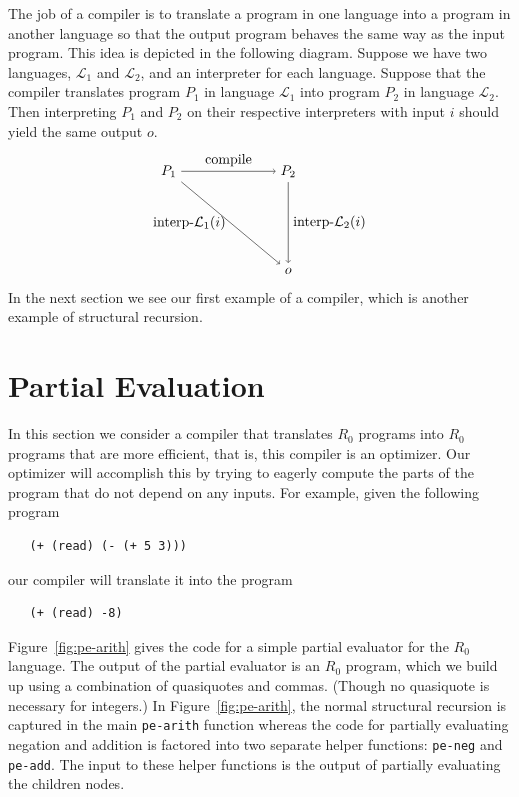 \documentclass[11pt]{book}
\begin{document}
The job of a compiler is to translate a program in one language into a
program in another language so that the output program behaves the
same way as the input program. This idea is depicted in the following
diagram. Suppose we have two languages, $\mathcal{L}_1$ and
$\mathcal{L}_2$, and an interpreter for each language.  Suppose that
the compiler translates program $P_1$ in language $\mathcal{L}_1$ into
program $P_2$ in language $\mathcal{L}_2$.  Then interpreting $P_1$
and $P_2$ on their respective interpreters with input $i$ should yield
the same output $o$.
\begin{equation} \label{eq:compile-correct}
\begin{tikzpicture}[baseline=(current  bounding  box.center)]
 \node (p1) at (0,  0) {$P_1$};
 \node (p2) at (3,  0) {$P_2$};
 \node (o)  at (3, -2.5) {$o$};

 \path[->] (p1) edge [above] node {compile} (p2);
 \path[->] (p2) edge [right] node {interp-$\mathcal{L}_2$($i$)} (o);
 \path[->] (p1) edge [left]  node {interp-$\mathcal{L}_1$($i$)} (o);
\end{tikzpicture}
\end{equation}
In the next section we see our first example of a compiler, which is
another example of structural recursion.


\section{Partial Evaluation}
\label{sec:partial-evaluation}

In this section we consider a compiler that translates $R_0$
programs into $R_0$ programs that are more efficient, that is,
this compiler is an optimizer. Our optimizer will accomplish this by
trying to eagerly compute the parts of the program that do not depend
on any inputs. For example, given the following program
\begin{lstlisting}
   (+ (read) (- (+ 5 3)))
\end{lstlisting}
our compiler will translate it into the program
\begin{lstlisting}
   (+ (read) -8)
\end{lstlisting}

Figure~\ref{fig:pe-arith} gives the code for a simple partial
evaluator for the $R_0$ language. The output of the partial evaluator
is an $R_0$ program, which we build up using a combination of
quasiquotes and commas. (Though no quasiquote is necessary for
integers.) In Figure~\ref{fig:pe-arith}, the normal structural
recursion is captured in the main \texttt{pe-arith} function whereas
the code for partially evaluating negation and addition is factored
into two separate helper functions: \texttt{pe-neg} and
\texttt{pe-add}. The input to these helper functions is the output of
partially evaluating the children nodes.
\end{document}
